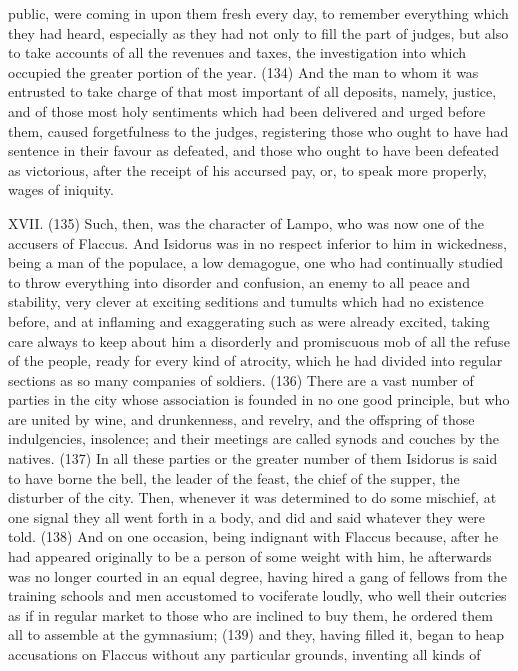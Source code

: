 public, were coming in upon them fresh every day, to remember everything which they had heard,
especially as they had not only to fill the part of judges, but also to take accounts of all the
revenues and taxes, the investigation into which occupied the greater portion of the year. (134)
And the man to whom it was entrusted to take charge of that most important of all deposits, namely,
justice, and of those most holy sentiments which had been delivered and urged before them,
caused forgetfulness to the judges, registering those who ought to have had sentence in their
favour as defeated, and those who ought to have been defeated as victorious, after the receipt of
his accursed pay, or, to speak more properly, wages of iniquity.

XVII. (135) Such, then, was the character of Lampo, who was now one of the accusers of Flaccus.
And Isidorus was in no respect inferior to him in wickedness, being a man of the populace, a low
demagogue, one who had continually studied to throw everything into disorder and confusion, an
enemy to all peace and stability, very clever at exciting seditions and tumults which had no
existence before, and at inflaming and exaggerating such as were already excited, taking care
always to keep about him a disorderly and promiscuous mob of all the refuse of the people, ready
for every kind of atrocity, which he had divided into regular sections as so many companies of
soldiers. (136) There are a vast number of parties in the city whose association is founded in no
one good principle, but who are united by wine, and drunkenness, and revelry, and the offspring of
those indulgencies, insolence; and their meetings are called synods and couches by the natives.
(137) In all these parties or the greater number of them Isidorus is said to have borne the bell, the
leader of the feast, the chief of the supper, the disturber of the city. Then, whenever it was
determined to do some mischief, at one signal they all went forth in a body, and did and said
whatever they were told. (138) And on one occasion, being indignant with Flaccus because, after
he had appeared originally to be a person of some weight with him, he afterwards was no longer
courted in an equal degree, having hired a gang of fellows from the training schools and men
accustomed to vociferate loudly, who well their outcries as if in regular market to those who are
inclined to buy them, he ordered them all to assemble at the gymnasium; (139) and they, having
filled it, began to heap accusations on Flaccus without any particular grounds, inventing all kinds of
